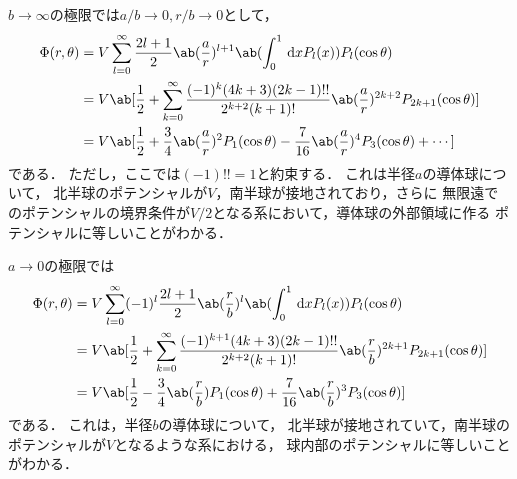 $b \to \infty$の極限では$a/b \to 0, r/b\to 0$として，
\begin{align}%
  \Phi(r,\theta) 
  &= V
  \sum_{l=0}^\infty \frac{2l+1}{2}\ab(\frac{a}{r})^{l+1}
  \ab(\int_0^1\dl{x} P_l(x)) P_l(\cos\theta)\notag\\
  &= V\ab[
    \frac{1}{2} + \sum_{k=0}^\infty \frac{(-1)^k(4k+3)(2k-1)!!}{2^{k+2}(k+1)!} 
    \ab(\frac ar)^{2k+2} P_{2k+1}(\cos\theta)
  ]\\
  &= V\ab[
    \frac{1}{2} + \frac{3}{4}\ab(\frac{a}{r})^2 P_1(\cos\theta) -
    \frac{7}{16}\ab(\frac{a}{r})^4 P_3(\cos\theta) + \cdots
  ]
\end{align}%
である．
ただし，ここでは$(-1)!! = 1$と約束する．
これは半径$a$の導体球について，
北半球のポテンシャルが$V$，南半球が接地されており，さらに
無限遠でのポテンシャルの境界条件が$V/2$となる系において，導体球の外部領域に作る
ポテンシャルに等しいことがわかる．

$a \to 0$の極限では
\begin{align}%
  \Phi(r,\theta) &= V \sum_{l=0}^\infty (-1)^l \frac{2l+1}{2} \ab(\frac rb)^{l} 
  \ab(\int_0^1\dl{x} P_l(x)) P_l(\cos\theta)\notag\\
  &= V\ab[\frac 12 + \sum_{k=0}^\infty \frac{(-1)^{k+1}(4k+3)(2k-1)!!}{2^{k+2}(k+1)!}
  \ab(\frac rb)^{2k+1} P_{2k+1} (\cos\theta)]\\
  &= V\ab[\frac 12 - \frac 34 \ab(\frac rb) P_1(\cos\theta) +
  \frac{7}{16}\ab(\frac rb)^3P_3(\cos\theta)]
\end{align}%
である．
これは，半径$b$の導体球について，
北半球が接地されていて，南半球のポテンシャルが$V$となるような系における，
球内部のポテンシャルに等しいことがわかる．

